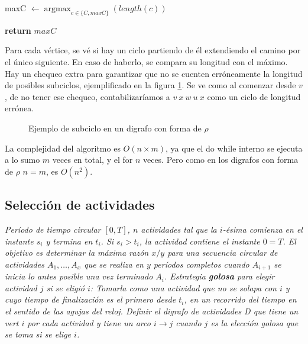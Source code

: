 \documentclass[12pt, a4paper]{report}
\DeclareMathOperator*{\argmax}{argmax}
\theoremstyle{definition} %
\begin{document}
\begin{enumerate}[a)]
\begin{algorithm}[H]
\begin{algorithmic}[1]
                    \State maxC $\gets \argmax_{c \in \{C, maxC\}}(length(c))$
                \EndFor

                \State \textbf{return} $maxC$
            \EndFunction
        \end{algorithmic}
    \end{algorithm}

    Para cada vértice, se vé si hay un ciclo partiendo de él extendiendo el camino por el único siguiente. En caso de haberlo, se compara su longitud con el máximo. Hay un chequeo extra para garantizar que no se cuenten erróneamente la longitud de posibles subciclos, ejemplificado en la figura \ref{1/subciclos}. Se ve como al comenzar desde $v$, de no tener ese chequeo, contabilizaríamos a $v\ x\ w\ u\ x$ como un ciclo de longitud errónea.

    \begin{figure}[H]
        \centering
        \caption{Ejemplo de subciclo en un digrafo con forma de $\rho$}
        \label{1/subciclos}
    \end{figure}

    La complejidad del algoritmo es $O(n \times m)$, ya que el do while interno se ejecuta a lo sumo $m$ veces en total, y el for $n$ veces. Pero como en los digrafos con forma de $\rho$ $n = m$, es $O(n^2)$.

\end{enumerate}

\subsection*{Selección de actividades}

\textit{Período de tiempo circular $[0, T]$, $n$ actividades tal que la $i$-ésima comienza en el instante $s_i$ y termina en $t_i$. Si $s_i > t_i$, la actividad contiene el instante $0=T$. El objetivo es determinar la máxima razón $x / y$ para una secuencia circular de actividades $A_1, \ldots, A_x$ que se realiza en $y$ períodos completos cuando $A_{i+1}$ se inicia lo antes posible una vez terminado $A_i$. Estrategia \textbf{golosa} para elegir actividad $j$ si se eligió $i$: Tomarla como una actividad que no se solapa con $i$ y cuyo tiempo de finalización es el primero desde $t_i$, en un recorrido del tiempo en el sentido de las agujas del reloj. Definir el digrafo de actividades D que tiene un vert $i$ por cada actividad y tiene un arco $i \to j$ cuando $j$ es la elección golosa que se toma si se elige $i$.}
\end{document}
